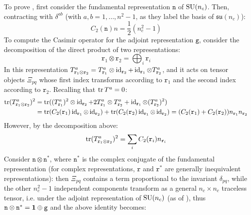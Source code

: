 To prove , first consider the fundamental representation $ \mathtt{n} $ of $ \mathrm{SU}(n_c) $.
Then, contracting  with $ \delta^{ab} $ (with $ a,b = 1,\dots, n^2 - 1 $, as they label the basis of $ \mathfrak{su}(n_c) $):
\begin{equation*}
  C_2(\mathtt{n}) n = \frac{1}{2} (n_c^2 - 1)
\end{equation*}
To compute the Casimir operator for the adjoint representation $ \mathtt{g} $, consider the decomposition of the direct product of two representations:
\begin{equation*}
  \mathtt{r}_1 \otimes \mathtt{r}_2 = \bigoplus_i \mathtt{r}_i
\end{equation*}
In this representation $ T^a_{\mathtt{r}_1 \otimes \mathtt{r}_2} = T^a_{\mathtt{r}_1} \otimes \operatorname{id}_{\mathtt{r}_2} + \operatorname{id}_{\mathtt{r}_1} \otimes T^a_{\mathtt{r}_2} $, and it acts on tensor objects $ \Xi_{pq} $ whose first index transforms according to $ \mathtt{r}_1 $ and the second index according to $ \mathtt{r}_2 $. Recalling that $ \operatorname{tr}{T^a} = 0 $:
\begin{equation*}
  \begin{split}
    \operatorname{tr} (T^a_{\mathtt{r}_1 \otimes \mathtt{r}_2})^2
    &= \operatorname{tr} ((T^a_{\mathtt{r}_1})^2 \otimes \operatorname{id}_{\mathtt{r}_2} + 2 T^a_{\mathtt{r}_1} \otimes T^a_{\mathtt{r}_2} + \operatorname{id}_{\mathtt{r}_1} \otimes (T^a_{\mathtt{r}_2})^2) \\
    &= \operatorname{tr} (C_2(\mathtt{r}_1) \operatorname{id}_{\mathtt{r}_1} \otimes \operatorname{id}_{\mathtt{r}_2}) + \operatorname{tr} (C_2(\mathtt{r}_2) \operatorname{id}_{\mathtt{r}_1} \otimes \operatorname{id}_{\mathtt{r}_2}) = (C_2(\mathtt{r}_1) + C_2(\mathtt{r}_2)) n_{\mathtt{r}_1} n_{\mathtt{r}_2}
  \end{split}
\end{equation*}
However, by the decomposition above:
\begin{equation*}
  \operatorname{tr} (T^a_{\mathtt{r}_1 \otimes \mathtt{r}_2})^2 = \sum_i C_2(\mathtt{r}_i) n_{\mathtt{r}_i}
\end{equation*}
Consider $ \mathtt{n} \otimes \mathtt{n}^* $, where $ \mathtt{n}^* $ is the complex conjugate of the fundamental representation (for complex representations, $ \mathtt{r} $ and $ \mathtt{r}^* $ are generally inequivalent representations): then $ \Xi_{pq} $ contains a term proportional to the invariant $ \delta_{pq} $, while the other $ n_c^2 - 1 $  independent components transform as a general $ n_c \times n_c $ traceless tensor, i.e. under the adjoint representation of $ \mathrm{SU}(n_c) $ (as of ), thus $ \mathtt{n} \otimes \mathtt{n}^* = \mathbf{1} \oplus \mathtt{g} $ and the above identity becomes:
